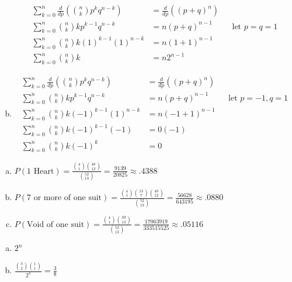 \documentclass[12pt]{article}
\newenvironment{problem}[2][Problem]{\begin{trivlist}
\item[\hskip \labelsep {\bfseries #1}\hskip \labelsep {\bfseries #2.}]
  \vspace{1 cm}
}{\end{trivlist}}
\begin{document}
\begin{problem}{2.31}
\begin{enumerate}[a.]
\begin{align*}
        \sum_{k=0}^n \frac{d}{dp}\left( \binom{n}{k} p^k q^{n-k}\right) &= \frac{d}{dp}\left((p+q)^n \right) \\
        \sum_{k=0}^n \binom{n}{k}k p^{k-1} q^{n-k} &= n(p+q)^{n-1} & & \textrm{let } p=q=1 \\
        \sum_{k=0}^n \binom{n}{k}k(1)^{k-1}(1)^{n-k} &= n(1+1)^{n-1} \\
        \sum_{k=0}^n \binom{n}{k}k &= n2^{n-1}
      \end{align*}
    \item %
       \begin{align*}
        \sum_{k=0}^n \frac{d}{dp}\left( \binom{n}{k} p^k q^{n-k}\right) &= \frac{d}{dp}\left((p+q)^n \right) \\
        \sum_{k=0}^n \binom{n}{k}k p^{k-1} q^{n-k} &= n(p+q)^{n-1} & & \textrm{let } p=-1, q=1 \\
        \sum_{k=0}^n \binom{n}{k}k(-1)^{k-1}(1)^{n-k} &= n(-1+1)^{n-1} \\
        \sum_{k=0}^n \binom{n}{k}k(-1)^{k-1}(-1) &= 0(-1) \\
        \sum_{k=0}^n \binom{n}{k}k(-1)^{k} &= 0 
      \end{align*}
  \end{enumerate}
\end{problem}

\begin{problem}{2.33}
\item
  \begin{enumerate}[a.]
    \item %
      $P(\textrm{1 Heart}) =  \frac{\binom{4}{1} \binom{48}{12}}{\binom{52}{13}} = \frac{9139}{20825} \approx .4388$
    \item %
      $P(\textrm{7 or more of one suit}) 
      =  \frac{\binom{4}{1} \binom{13}{7} \binom{48}{12}}{\binom{52}{13}}
      = \frac{56628}{643195} \approx .0880$
    \item %
      $P(\textrm{Void of one suit}) 
      =  \frac{\binom{4}{1} \binom{39}{13}}{\binom{52}{13}} 
      = \frac{17063919}{333515525} \approx .05116$
  \end{enumerate}
\end{problem}

\begin{problem}{2.35}
\item
  \begin{enumerate}[a.]
    \item %
      $2^n$
    \item %
      $\frac{\binom{3}{2} \binom{1}{1}}{2^3} = \frac{3}{8}$     
  \end{enumerate}
\end{problem}
\end{document}
